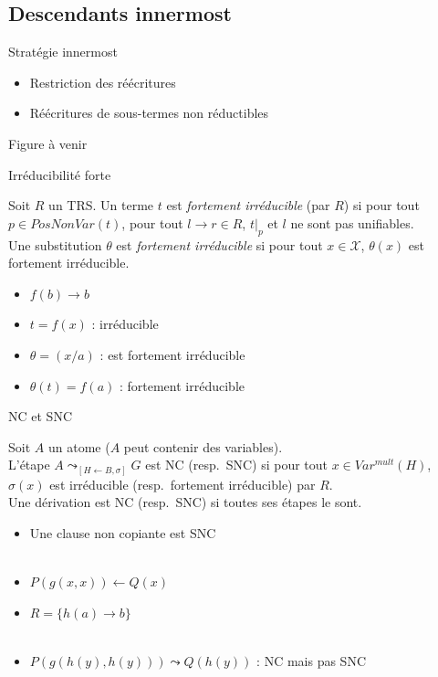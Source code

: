 \documentclass[xcolor={dvipsnames}]{beamer}
\begin{document}
\subsection{Descendants innermost}

\begin{frame}{Stratégie innermost}
  \begin{itemize}
  \item Restriction des réécritures
  \item Réécritures de sous-termes non réductibles
  \end{itemize}
  \begin{center}
    Figure à venir
  \end{center}
\end{frame}

\begin{frame}{Irréducibilité forte}
  \begin{Definition}
    Soit $R$ un TRS.
    Un terme $t$ est {\em fortement irréducible} (par $R$) si
    pour tout $p \in \textit{PosNonVar}(t)$, pour tout $l \rightarrow r \in R$,
    $t|_p$ et $l$ ne sont pas unifiables.\\
    Une substitution $\theta$ est {\em fortement irréducible} si
    pour tout $x \in \mathcal{X}$, $\theta(x)$ est fortement irréducible.
  \end{Definition}
  \begin{itemize}
  \item {} $f(b) \rightarrow b$
  \item {} $t = f(x)$ :  irréducible
  \item {} $\theta = (x/a)$ :  est fortement irréducible
  \item {} $\theta(t) = f(a)$ :  fortement irréducible
  \end{itemize}
\end{frame}

\begin{frame}{NC et SNC}
  \begin{Definition}
    Soit $A$ un atome ($A$ peut contenir des variables).\\
    L'étape $A \leadsto_{[H\leftarrow B,\sigma]} G$ est NC (resp.\ SNC) si
    pour tout $x \in Var^{mult}(H)$, $\sigma(x)$ est irréducible (resp.\ fortement irréducible) par $R$.\\
    Une dérivation est NC (resp.\ SNC) si toutes ses étapes le sont.
  \end{Definition}
  \begin{itemize}[<+->]
  \item Une clause non copiante est SNC \\~
    
  \item $P(g(x,x)) \leftarrow Q(x)$
  \item $R = \{h(a) \rightarrow b\}$ \\~

  \item $P(g(h(y),h(y))) \leadsto Q(h(y))$ : NC mais pas SNC
  \end{itemize}
\end{frame}
\end{document}
